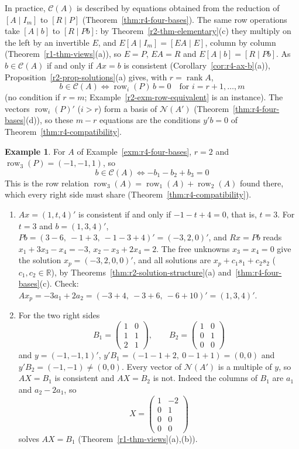 \documentclass[12pt]{article}
\newcommand{\R}{\mathbb R}
\DeclareMathOperator{\row}{row}
\DeclareMathOperator{\rank}{rank}
\theoremstyle{definition}
\newtheorem{example}[theorem]{Example}
\begin{document}
In practice, \(\mathcal C(A)\) is described by equations obtained from the reduction of \([A\mid I_m]\) to
\([R\mid P]\) (Theorem~\ref{thm:r4-four-bases}). The same row operations take \([A\mid b]\) to \([R\mid Pb]\): by
Theorem~\ref{r2-thm-elementary}(c) they multiply on the left by an invertible \(E\), and \(E[A\mid I_m]=[EA\mid E]\),
column by column (Theorem~\ref{r1-thm-views}(a)), so \(E=P\), \(EA=R\) and \(E[A\mid b]=[R\mid Pb]\). As
\(b\in\mathcal C(A)\) if and only if \(Ax=b\) is consistent (Corollary~\ref{cor:r4-ax-b}(a)),
Proposition~\ref{r2-prop-solutions}(a) gives, with \(r=\rank A\),
\[
b\in\mathcal C(A)\iff\row_i(P)\,b=0\quad\text{for }i=r+1,\dots,m
\]
(no condition if \(r=m\); Example~\ref{r2-exm-row-equivalent} is an instance). The vectors \(\row_i(P)'\)
(\(i>r\)) form a basis of \(\mathcal N(A')\)
(Theorem~\ref{thm:r4-four-bases}(d)), so these \(m-r\) equations are the conditions \(y'b=0\) of
Theorem~\ref{thm:r4-compatibility}.

\begin{example}\label{exm:r4-compatibility}
For \(A\) of Example~\ref{exm:r4-four-bases}, \(r=2\) and \(\row_3(P)=(-1,-1,1)\), so
\[
b\in\mathcal C(A)\iff -b_1-b_2+b_3=0
\]
This is the row relation \(\row_3(A)=\row_1(A)+\row_2(A)\) found there, which every right side must share
(Theorem~\ref{thm:r4-compatibility}).
\begin{enumerate}
\item \(Ax=(1,t,4)'\) is consistent if and only if \(-1-t+4=0\), that is, \(t=3\). For \(t=3\) and \(b=(1,3,4)'\),
\(Pb=(3-6,\ -1+3,\ -1-3+4)'=(-3,2,0)'\), and \(Rx=Pb\) reads \(x_1+3x_3-x_4=-3\), \(x_2-x_3+2x_4=2\). The free
unknowns \(x_3=x_4=0\) give the solution \(x_p=(-3,2,0,0)'\), and all solutions are \(x_p+c_1s_1+c_2s_2\)
(\(c_1,c_2\in\R\)), by Theorems~\ref{thm:r2-solution-structure}(a) and~\ref{thm:r4-four-bases}(c). Check:
\(Ax_p=-3a_1+2a_2=(-3+4,\ -3+6,\ -6+10)'=(1,3,4)'\).
\item For the two right sides
\[
B_1=\begin{pmatrix}1&0\\1&1\\2&1\end{pmatrix},\qquad B_2=\begin{pmatrix}1&0\\0&1\\0&0\end{pmatrix}
\]
and \(y=(-1,-1,1)'\), \(y'B_1=(-1-1+2,\ 0-1+1)=(0,0)\) and \(y'B_2=(-1,-1)\ne(0,0)\). Every vector of
\(\mathcal N(A')\) is a multiple of \(y\), so \(AX=B_1\) is consistent and \(AX=B_2\) is not. Indeed the columns of
\(B_1\) are \(a_1\) and \(a_2-2a_1\), so
\[
X=\begin{pmatrix}1&-2\\0&1\\0&0\\0&0\end{pmatrix}
\]
solves \(AX=B_1\) (Theorem~\ref{r1-thm-views}(a),(b)).
\end{enumerate}
\end{example}
\end{document}
